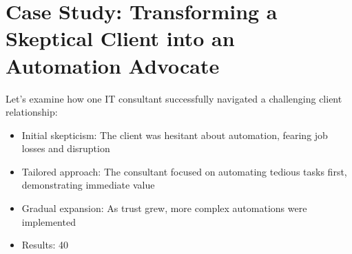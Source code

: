 \section{Case Study: Transforming a Skeptical Client into an Automation Advocate}

Let's examine how one IT consultant successfully navigated a challenging client relationship:

\begin{itemize}
    \item Initial skepticism: The client was hesitant about automation, fearing job losses and disruption
    \item Tailored approach: The consultant focused on automating tedious tasks first, demonstrating immediate value
    \item Gradual expansion: As trust grew, more complex automations were implemented
    \item Results: 40%
\end{itemize}

